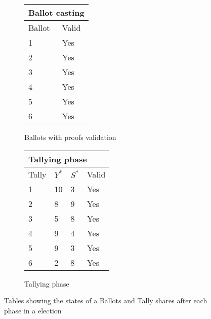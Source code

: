 \begin{figure}[H]
    \centering
    \captionsetup[subfigure]{labelformat=empty}
    \begin{subfigure}[b]{0.45\textwidth}
        \begin{table}[H]
            \centering
            \begin{tabular}{|l|l|}
                \hline
                \multicolumn{2}{|l|}{Ballot casting} \\ \hline
                Ballot   & Valid              \\ \hline
                1        & Yes                \\ \hline
                2        & Yes                \\ \hline
                3        & Yes                \\ \hline
                4        & Yes                \\ \hline
                5        & Yes                \\ \hline
                6        & Yes                \\ \hline
            \end{tabular}
        \end{table}
        \caption{Ballots with proofs validation}
    \end{subfigure}
    \qquad %
    \qquad %
    \begin{subfigure}[b]{0.40\textwidth}
        \begin{table}[H]
            \centering
            \begin{tabular}{|l|l|l|l|}
                \hline
                \multicolumn{4}{|l|}{Tallying phase}       \\ \hline
                Tally & $Y^*$ & $S^*$ & Valid                    \\ \hline
                1     & 10 & 3  & Yes                      \\ \hline
                2     & 8  & 9  & Yes                      \\ \hline
                3     & 5  & 8  & Yes                      \\ \hline
                4     & 9  & 4  & Yes                      \\ \hline
                5     & 9  & 3  & Yes                      \\ \hline
                6     & 2  & 8  & Yes                      \\ \hline
            \end{tabular}
        \end{table}
        \caption{Tallying phase}
    \end{subfigure}
    \caption{Tables showing the states of a Ballots and Tally shares after each phase in a election}
    \label{fig:discussion:ballot_casting_and_tallying_phase}
\end{figure}




